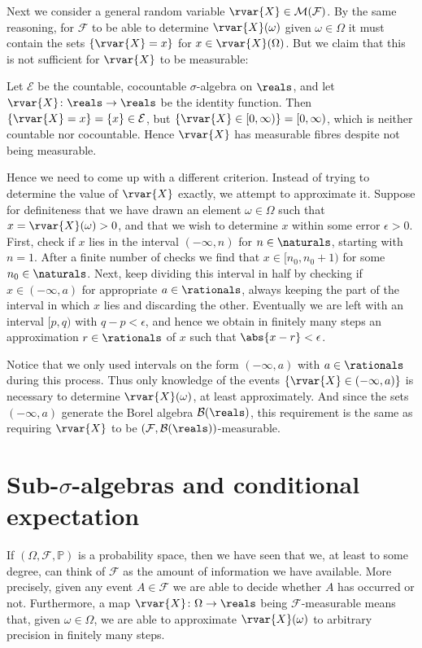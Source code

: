 \documentclass[article, a4paper, 11pt, oneside]{memoir}
\numberwithin{equation}{chapter}
\newcommand{\calB}{\mathcal{B}}
\newcommand{\calE}{\mathcal{E}}
\newcommand{\calF}{\mathcal{F}}
\newcommand{\borel}[1]{\calB(#1)}
\renewcommand{\P}{\mathbb{P}}
\begin{document}
Next we consider a general random variable $\rvar{X} \in \meas{\calF}$. By the same reasoning, for $\calF$ to be able to determine $\rvar{X}(\omega)$ given $\omega \in \Omega$ it must contain the sets $\{\rvar{X} = x\}$ for $x \in \rvar{X}(\Omega)$. But we claim that this is not sufficient for $\rvar{X}$ to be measurable:
%
\begin{example}
    Let $\calE$ be the countable, cocountable $\sigma$-algebra on $\reals$, and let $\rvar{X} \colon \reals \to \reals$ be the identity function. Then $\{\rvar{X} = x\} = \{x\} \in \calE$, but $\{\rvar{X} \in [0,\infty)\} = [0, \infty)$, which is neither countable nor cocountable. Hence $\rvar{X}$ has measurable fibres despite not being measurable.
\end{example}
%
Hence we need to come up with a different criterion. Instead of trying to determine the value of $\rvar{X}$ exactly, we attempt to approximate it. Suppose for definiteness that we have drawn an element $\omega \in \Omega$ such that $x = \rvar{X}(\omega) > 0$, and that we wish to determine $x$ within some error $\epsilon > 0$. First, check if $x$ lies in the interval $(-\infty,n)$ for $n \in \naturals$, starting with $n = 1$. After a finite number of checks we find that $x \in [n_0, n_0+1)$ for some $n_0 \in \naturals$. Next, keep dividing this interval in half by checking if $x \in (-\infty, a)$ for appropriate $a \in \rationals$, always keeping the part of the interval in which $x$ lies and discarding the other. Eventually we are left with an interval $[p,q)$ with $q-p < \epsilon$, and hence we obtain in finitely many steps an approximation $r \in \rationals$ of $x$ such that $\abs{x-r} < \epsilon$.

Notice that we only used intervals on the form $(-\infty, a)$ with $a \in \rationals$ during this process. Thus only knowledge of the events $\{\rvar{X} \in (-\infty, a)\}$ is necessary to determine $\rvar{X}(\omega)$, at least approximately. And since the sets $(-\infty, a)$ generate the Borel algebra $\borel{\reals}$, this requirement is the same as requiring $\rvar{X}$ to be $(\calF,\borel{\reals})$-measurable.


\section[Sub-sigma-algebras and conditional expectation][Sub-$\sigma$-algebras and conditional expectation]{Sub-$\sigma$-algebras and conditional expectation}

If $(\Omega, \calF, \P)$ is a probability space, then we have seen that we, at least to some degree, can think of $\calF$ as the amount of information we have available. More precisely, given any event $A \in \calF$ we are able to decide whether $A$ has occurred or not. Furthermore, a map $\rvar{X} \colon \Omega \to \reals$ being $\calF$-measurable means that, given $\omega \in \Omega$, we are able to approximate $\rvar{X}(\omega)$ to arbitrary precision in finitely many steps.
\end{document}
